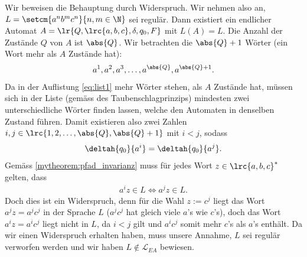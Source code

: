 \begin{myanswer}[myexercise:0405]
    Wir beweisen die Behauptung durch Widerspruch. Wir nehmen also an, $L = \setcm{a^nb^mc^n}{n,m\in\N}$ sei regulär. Dann existiert ein endlicher Automat $A = \lr{Q,\lrc{a, b, c}, \delta, q_0, F}$ mit $L(A) = L$. Die Anzahl der Zustände $Q$ von $A$ ist $\abs{Q}$. Wir betrachten die $\abs{Q}+1$ Wörter (ein Wort mehr als $A$ Zustände hat):
	\begin{align}\label{eq:list1}
		a^1, a^2, a^3, \ldots , a^{\abs{Q}}, a^{\abs{Q}+1}.
	\end{align}
	Da in der Auflistung \ref{eq:list1} mehr Wörter stehen, als $A$ Zustände hat, müssen sich in der Liste (gemäss des Taubenschlagprinzips) mindesten zwei unterschiedliche Wörter finden lassen, welche den Automaten in denselben Zustand führen. Damit existieren also zwei Zahlen $i,j\in\lrc{1,2,\ldots ,\abs{Q}, \abs{Q}+1}$ mit $i<j$, sodass
	\begin{align*}
		\deltah{q_0}{a^i} = \deltah{q_0}{a^j}.
	\end{align*}
	Gemäss \cref{mytheorem:pfad_invarianz} muss für jedes Wort $z\in\lrc{a, b, c}^*$ gelten, dass
	\begin{align*}
		a^iz\in L \Longleftrightarrow a^jz\in L.
	\end{align*}
	Doch dies ist ein Widerspruch, denn für die Wahl $z := c^j$ liegt das Wort $a^jz = a^jc^j$ in der Sprache $L$ ($a^jc^j$ hat gleich viele $a$'s wie $c$'s), doch das Wort $a^iz = a^ic^j$ liegt nicht in $L$, da $i<j$ gilt und $a^ic^j$ somit mehr $c$'s als $a$'s enthält. Da wir einen Widerspruch erhalten haben, muss unsere Annahme, $L$ sei regulär verworfen werden und wir haben $L\notin \mathcal{L}_{EA}$ bewiesen.
\end{myanswer}

